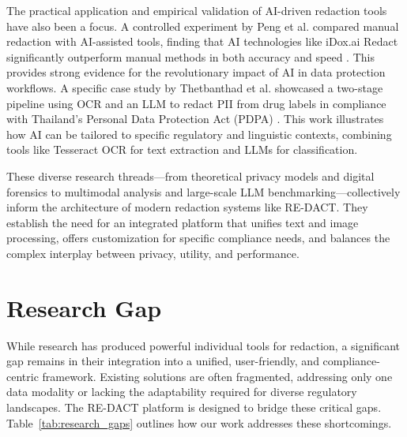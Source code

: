 \documentclass[conference]{IEEEtran}
\begin{document}
The practical application and empirical validation of AI-driven redaction tools have also been a focus. A controlled experiment by Peng et al. compared manual redaction with AI-assisted tools, finding that AI technologies like iDox.ai Redact significantly outperform manual methods in both accuracy and speed \cite{b15}. This provides strong evidence for the revolutionary impact of AI in data protection workflows. A specific case study by Thetbanthad et al. showcased a two-stage pipeline using OCR and an LLM to redact PII from drug labels in compliance with Thailand's Personal Data Protection Act (PDPA) \cite{b16}. This work illustrates how AI can be tailored to specific regulatory and linguistic contexts, combining tools like Tesseract OCR \cite{b6} for text extraction and LLMs for classification.

These diverse research threads---from theoretical privacy models and digital forensics to multimodal analysis and large-scale LLM benchmarking---collectively inform the architecture of modern redaction systems like RE-DACT. They establish the need for an integrated platform that unifies text and image processing, offers customization for specific compliance needs, and balances the complex interplay between privacy, utility, and performance.

\section{Research Gap}

While research has produced powerful individual tools for redaction, a significant gap remains in their integration into a unified, user-friendly, and compliance-centric framework. Existing solutions are often fragmented, addressing only one data modality or lacking the adaptability required for diverse regulatory landscapes. The RE-DACT platform is designed to bridge these critical gaps. Table~\ref{tab:research_gaps} outlines how our work addresses these shortcomings.
\end{document}
